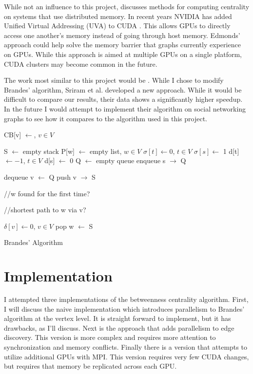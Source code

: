 \documentclass[10pt,twocolumn]{article}
\begin{document}
While not an influence to this project, \cite{distributedCentrality} discusses methods for computing centrality on systems that use distributed memory. In recent years NVIDIA has added Unified Virtual Addressing (UVA) to CUDA \cite{cudaUVA}. This allows GPUs to directly access one another's memory instead of going through host memory. Edmonds' approach could help solve the memory barrier that graphs currently experience on GPUs. While this approach is aimed at multiple GPUs on a single platform, CUDA clusters may become common in the future.

The work most similar to this project would be \cite{evalCentrality}. While I chose to modify Brandes' algorithm, Sriram et al. developed a new approach. While it would be difficult to compare our results, their data shows a significantly higher speedup. In the future I would attempt to implement their algorithm on social networking graphs to see how it compares to the algorithm used in this project.

\begin{algorithm}[h!]
CB[v] $\leftarrow$, $v \in V$\;
{
	S $\leftarrow$ empty stack\;
	P[w] $\leftarrow$ empty list, $w \in V$\;
	$\sigma [t] \leftarrow 0$, $t \in V$\; $\sigma [s] \leftarrow$ 1\;
	d[t] $\leftarrow - 1$, $t \in V$\; d[s] $\leftarrow$ 0\;
	Q $\leftarrow$ empty queue\;
	enqueue s $\rightarrow$ Q\;
	{
		dequeue v $\leftarrow$ Q\;
		push v $\rightarrow$ S\;
		{
			//w found for the first time? \newline
			
			//shortest path to w via v? \newline
		}	
	}


	$\delta[v] \leftarrow 0$, $v \in V$\;
	{
		pop w $\leftarrow$ S\;
	}
}

\caption{Brandes' Algorithm}
\label{alg:Brande}
\end{algorithm}
 
\section{Implementation}
I attempted three implementations of the betweenness centrality algorithm. First, I will discuss the naive implementation which introduces parallelism to Brandes' algorithm at the vertex level. It is straight forward to implement, but it has drawbacks, as I'll discuss. Next is the approach that adds parallelism to edge discovery. This version is more complex and requires more attention to synchronization and memory conflicts. Finally there is a version that attempts to utilize additional GPUs with MPI. This version requires very few CUDA changes, but requires that memory be replicated across each GPU.
 
\end{document}
